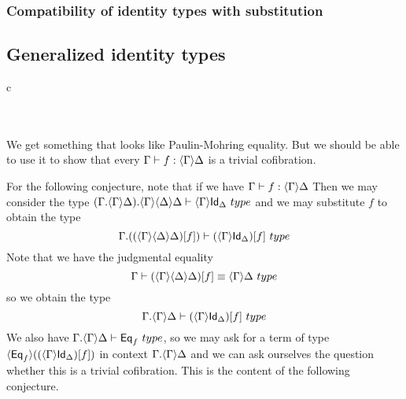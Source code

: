 \subsubsection{Compatibility of identity types with substitution}

\subsection{Generalized identity types}

\begin{infarray}{c}
\\
\\
          {}\\
          {}
\end{infarray}

We get something that looks like Paulin-Mohring equality. But we should be able to use it to
show that every $\jterm{\Gamma}{\ctxwk{\Gamma}{\Delta}}{f}$ is a trivial cofibration.

For the following conjecture, note that if we have $\jterm{\Gamma}{\ctxwk{\Gamma}{\Delta}}{f}$
Then we may consider the type $\jtype{\ctxext{{\Gamma}{\ctxwk{\Gamma}{\Delta}}}{\ctxwk{\Gamma}{{\Delta}{\Delta}}}}
{\ctxwk{\Gamma}{\idtypevar{\Delta}}}$ and we may substitute $f$ to obtain the type
\begin{equation*}
\jtype{\ctxext{\Gamma}{\subst{f}{\ctxwk{\Gamma}{{\Delta}{\Delta}}}}}
{\subst{f}{\ctxwk{\Gamma}{\idtypevar{\Delta}}}}
\end{equation*}
Note that we have the judgmental equality
\begin{equation*}
\jtypeeq{\Gamma}{\subst{f}{\ctxwk{\Gamma}{{\Delta}{\Delta}}}}{\ctxwk{\Gamma}{\Delta}}
\end{equation*}
so we obtain the type
\begin{equation*}
\jtype{\ctxext{\Gamma}{\ctxwk{\Gamma}{\Delta}}}
{\subst{f}{\ctxwk{\Gamma}{\idtypevar{\Delta}}}}
\end{equation*}
We also have $\jtype{\ctxext{\Gamma}{\ctxwk{\Gamma}{\Delta}}}{\eqtype{f}}$, so we
may ask for a term of type $\ctxwk{\eqtype{f}}{\subst{f}{\ctxwk{\Gamma}{\idtypevar{\Delta}}}}$
in context $\ctxext{\Gamma}{\ctxwk{\Gamma}{\Delta}}$ and we can ask ourselves the question
whether this is a trivial cofibration. This is the content of the following conjecture.

